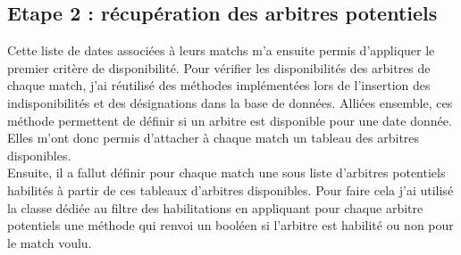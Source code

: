 \subsection{Etape 2 : récupération des arbitres potentiels}
\vspace{1cm}

Cette liste de dates associées à leurs matchs m’a ensuite permis d’appliquer le premier critère de disponibilité. Pour vérifier les disponibilités des arbitres de chaque match, j’ai réutilisé des méthodes implémentées lors de l’insertion des indisponibilités et des désignations dans la base de données. Alliées ensemble, ces méthode permettent de définir si un arbitre est disponible pour une date donnée. 
Elles m’ont donc permis d’attacher à chaque match un tableau des arbitres disponibles.\\

Ensuite, il a fallut définir pour chaque match une sous liste d’arbitres potentiels habilités à partir de ces tableaux d’arbitres disponibles. 
Pour faire cela j’ai utilisé la classe dédiée au filtre des habilitations en appliquant pour chaque arbitre potentiels une méthode qui renvoi un booléen si l’arbitre est habilité ou non pour le match voulu.